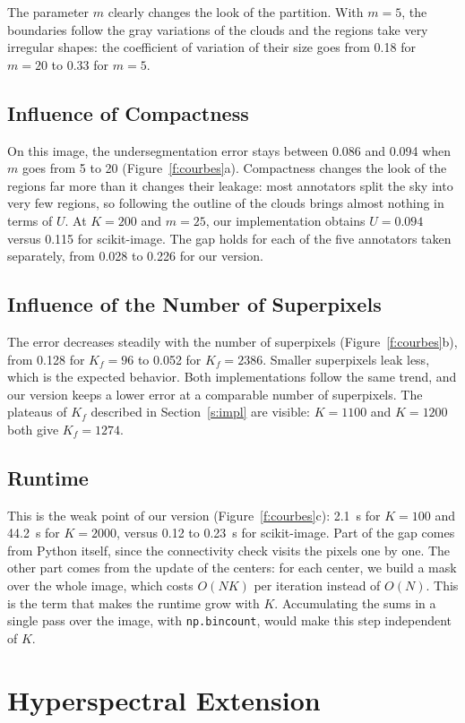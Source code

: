 The parameter $m$ clearly changes the look of the partition. With $m = 5$, the boundaries follow the gray
variations of the clouds and the regions take very
irregular shapes: the coefficient of variation of their size goes
from 0.18 for $m = 20$ to 0.33 for $m = 5$.

\subsection{Influence of Compactness}
On this image, the undersegmentation error stays
between 0.086 and 0.094 when $m$ goes from 5 to 20
(Figure~\ref{f:courbes}a). Compactness changes the look of the regions far
more than it changes their leakage: most
annotators split the sky into very few
regions, so following the outline of the clouds brings
almost nothing in terms of $U$. At $K = 200$ and $m = 25$, our
implementation obtains $U = 0.094$ versus 0.115 for
scikit-image. The gap holds for each of the five
annotators taken separately, from 0.028 to 0.226 for our version.

\subsection{Influence of the Number of Superpixels}
The error decreases steadily with the number of superpixels (Figure~\ref{f:courbes}b), from 0.128 for $K_f = 96$ to 0.052
for $K_f = 2386$. Smaller superpixels leak
less, which is the expected behavior. Both
implementations follow the same trend, and our version
keeps a lower error at a comparable number of superpixels. The plateaus of $K_f$ described in Section~\ref{s:impl} are
visible: $K = 1100$ and $K = 1200$ both give $K_f = 1274$.

\subsection{Runtime}
This is the weak point of our version (Figure~\ref{f:courbes}c): 2.1~s
for $K = 100$ and 44.2~s for $K = 2000$, versus 0.12 to
0.23~s for scikit-image. Part of the gap comes from Python
itself, since the connectivity check visits
the pixels one by one. The other part comes from the update
of the centers: for each center, we build a
mask over the whole image, which costs $O(NK)$ per iteration
instead of $O(N)$. This is the term that makes the
runtime grow with $K$. Accumulating the sums in a single
pass over the image, with \texttt{np.bincount}, would make this
step independent of $K$.

\section{Hyperspectral Extension}\label{s:hyper}

